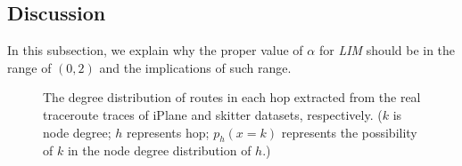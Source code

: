 \documentclass[a4paper]{llncs}
\begin{document}
\begin{comment}
In conclusion, through the examination on both real network datasets and also various synthetic graphs, \textit{LIM} with $\alpha$ in the range of $(0,2)$, more specifically $\alpha$ around 0.5, is recommended to best estimate almost all the topological properties of the underlying network.
\end{comment}

\subsection{Discussion}
In this subsection, we explain why the proper value of
$\alpha$ for \textit{LIM} should be in the range of $(0,2)$ and the implications of such range.


\begin{figure*}[!t]
\centering
{}
\hspace{2em}
\vspace{-1.7em}
\caption{The degree distribution of routes in each hop extracted from the real traceroute traces of iPlane and skitter datasets, respectively. ($k$ is node degree; $h$ represents hop; $p_h(x=k)$ represents the possibility of $k$ in the node degree distribution of $h$.)}
\label{figure12}
\vspace{-0.8em}
\end{figure*}
\end{document}
